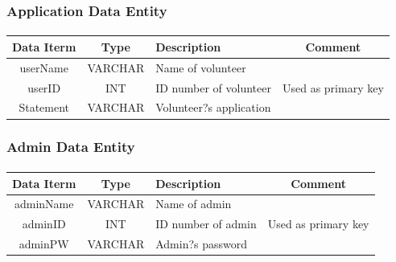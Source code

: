 \documentclass[12pt]{report}
\begin{document}
\subsubsection{Application Data Entity}
\paragraph{}
\begin{tabular}{|c|c|l|c|}
\hline
Data Iterm & Type & Description & Comment \\
\hline
userName &
VARCHAR &
Name of volunteer& \\
\hline
userID &
INT &
ID number of volunteer &
Used as primary key \\
\hline
Statement &
VARCHAR &
Volunteer?s application &\\
\hline
\end{tabular}


\subsubsection{Admin Data Entity}
\paragraph{}
\begin{tabular}{|c|c|l|c|}
\hline
Data Iterm & Type & Description & Comment \\
\hline
adminName &
VARCHAR &
Name of admin &\\
\hline
adminID &
INT &
ID number of admin &
Used as primary key \\
\hline
adminPW &
VARCHAR &
Admin?s password &\\
\hline
\end{tabular}


 
 
\end{document}
